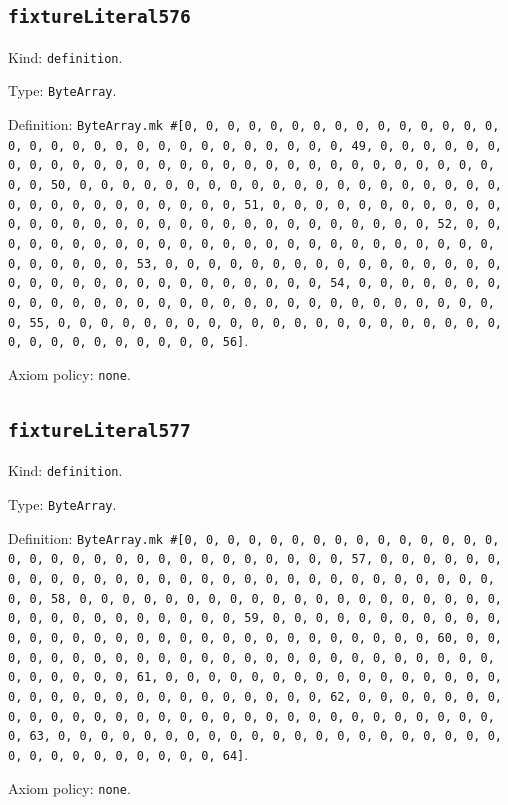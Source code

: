 \documentclass[11pt]{article}
\begin{document}
\subsection*{\texttt{fixtureLiteral576}}
\noindent Kind: \texttt{definition}.\par
\noindent Type: \texttt{ByteArray}.\par
\noindent Definition: \texttt{ByteArray.mk \#[0, 0, 0, 0, 0, 0, 0, 0, 0, 0, 0, 0, 0, 0, 0, 0, 0, 0, 0, 0, 0, 0, 0, 0, 0, 0, 0, 0, 0, 0, 0, 49, 0, 0, 0, 0, 0, 0, 0, 0, 0, 0, 0, 0, 0, 0, 0, 0, 0, 0, 0, 0, 0, 0, 0, 0, 0, 0, 0, 0, 0, 0, 0, 50, 0, 0, 0, 0, 0, 0, 0, 0, 0, 0, 0, 0, 0, 0, 0, 0, 0, 0, 0, 0, 0, 0, 0, 0, 0, 0, 0, 0, 0, 0, 0, 51, 0, 0, 0, 0, 0, 0, 0, 0, 0, 0, 0, 0, 0, 0, 0, 0, 0, 0, 0, 0, 0, 0, 0, 0, 0, 0, 0, 0, 0, 0, 0, 52, 0, 0, 0, 0, 0, 0, 0, 0, 0, 0, 0, 0, 0, 0, 0, 0, 0, 0, 0, 0, 0, 0, 0, 0, 0, 0, 0, 0, 0, 0, 0, 53, 0, 0, 0, 0, 0, 0, 0, 0, 0, 0, 0, 0, 0, 0, 0, 0, 0, 0, 0, 0, 0, 0, 0, 0, 0, 0, 0, 0, 0, 0, 0, 54, 0, 0, 0, 0, 0, 0, 0, 0, 0, 0, 0, 0, 0, 0, 0, 0, 0, 0, 0, 0, 0, 0, 0, 0, 0, 0, 0, 0, 0, 0, 0, 55, 0, 0, 0, 0, 0, 0, 0, 0, 0, 0, 0, 0, 0, 0, 0, 0, 0, 0, 0, 0, 0, 0, 0, 0, 0, 0, 0, 0, 0, 0, 0, 56]}.\par
\noindent Axiom policy: \texttt{none}.\par
\subsection*{\texttt{fixtureLiteral577}}
\noindent Kind: \texttt{definition}.\par
\noindent Type: \texttt{ByteArray}.\par
\noindent Definition: \texttt{ByteArray.mk \#[0, 0, 0, 0, 0, 0, 0, 0, 0, 0, 0, 0, 0, 0, 0, 0, 0, 0, 0, 0, 0, 0, 0, 0, 0, 0, 0, 0, 0, 0, 0, 57, 0, 0, 0, 0, 0, 0, 0, 0, 0, 0, 0, 0, 0, 0, 0, 0, 0, 0, 0, 0, 0, 0, 0, 0, 0, 0, 0, 0, 0, 0, 0, 58, 0, 0, 0, 0, 0, 0, 0, 0, 0, 0, 0, 0, 0, 0, 0, 0, 0, 0, 0, 0, 0, 0, 0, 0, 0, 0, 0, 0, 0, 0, 0, 59, 0, 0, 0, 0, 0, 0, 0, 0, 0, 0, 0, 0, 0, 0, 0, 0, 0, 0, 0, 0, 0, 0, 0, 0, 0, 0, 0, 0, 0, 0, 0, 60, 0, 0, 0, 0, 0, 0, 0, 0, 0, 0, 0, 0, 0, 0, 0, 0, 0, 0, 0, 0, 0, 0, 0, 0, 0, 0, 0, 0, 0, 0, 0, 61, 0, 0, 0, 0, 0, 0, 0, 0, 0, 0, 0, 0, 0, 0, 0, 0, 0, 0, 0, 0, 0, 0, 0, 0, 0, 0, 0, 0, 0, 0, 0, 62, 0, 0, 0, 0, 0, 0, 0, 0, 0, 0, 0, 0, 0, 0, 0, 0, 0, 0, 0, 0, 0, 0, 0, 0, 0, 0, 0, 0, 0, 0, 0, 63, 0, 0, 0, 0, 0, 0, 0, 0, 0, 0, 0, 0, 0, 0, 0, 0, 0, 0, 0, 0, 0, 0, 0, 0, 0, 0, 0, 0, 0, 0, 0, 64]}.\par
\noindent Axiom policy: \texttt{none}.\par
\end{document}
